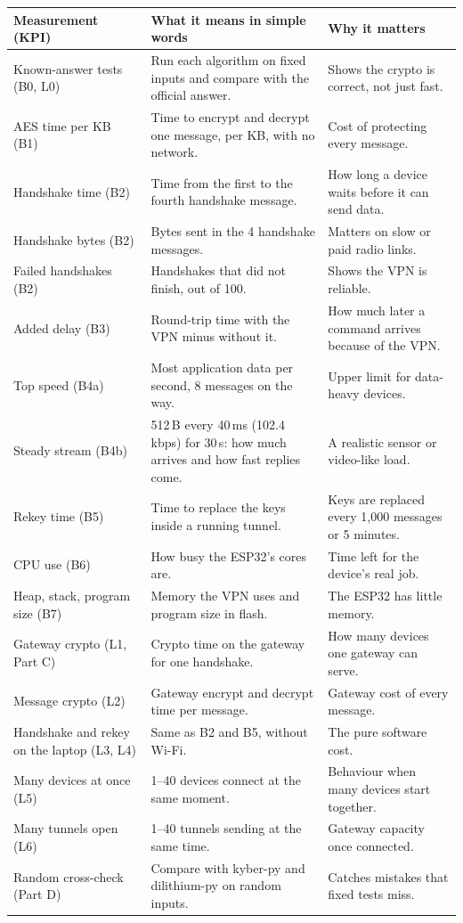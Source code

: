 \documentclass[10pt,a4paper]{article}
\begin{document}
\begin{table}[H]\centering\small
\begin{tabularx}{\linewidth}{>{\raggedright\arraybackslash}p{3.6cm}LL}
\toprule
Measurement (KPI) & What it means in simple words & Why it matters \\
\midrule
Known-answer tests (B0, L0) & Run each algorithm on fixed inputs and compare with the official answer. & Shows the crypto is correct, not just fast. \\
AES time per KB (B1) & Time to encrypt and decrypt one message, per KB, with no network. & Cost of protecting every message. \\
Handshake time (B2) & Time from the first to the fourth handshake message. & How long a device waits before it can send data. \\
Handshake bytes (B2) & Bytes sent in the 4 handshake messages. & Matters on slow or paid radio links. \\
Failed handshakes (B2) & Handshakes that did not finish, out of 100. & Shows the VPN is reliable. \\
Added delay (B3) & Round-trip time with the VPN minus without it. & How much later a command arrives because of the VPN. \\
Top speed (B4a) & Most application data per second, 8 messages on the way. & Upper limit for data-heavy devices. \\
Steady stream (B4b) & 512\,B every 40\,ms (102.4\,kbps) for 30\,s: how much arrives and how fast replies come. & A realistic sensor or video-like load. \\
Rekey time (B5) & Time to replace the keys inside a running tunnel. & Keys are replaced every 1,000 messages or 5 minutes. \\
CPU use (B6) & How busy the ESP32's cores are. & Time left for the device's real job. \\
Heap, stack, program size (B7) & Memory the VPN uses and program size in flash. & The ESP32 has little memory. \\
Gateway crypto (L1, Part C) & Crypto time on the gateway for one handshake. & How many devices one gateway can serve. \\
Message crypto (L2) & Gateway encrypt and decrypt time per message. & Gateway cost of every message. \\
Handshake and rekey on the laptop (L3, L4) & Same as B2 and B5, without Wi-Fi. & The pure software cost. \\
Many devices at once (L5) & 1--40 devices connect at the same moment. & Behaviour when many devices start together. \\
Many tunnels open (L6) & 1--40 tunnels sending at the same time. & Gateway capacity once connected. \\
Random cross-check (Part D) & Compare with kyber-py and dilithium-py on random inputs. & Catches mistakes that fixed tests miss. \\
\bottomrule
\end{tabularx}
\end{table}
\end{document}
